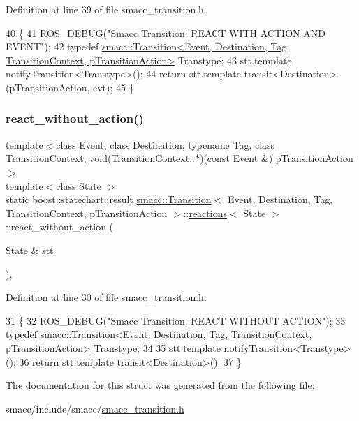 Definition at line 39 of file smacc\+\_\+transition.\+h.


\begin{DoxyCode}
40     \{
41       ROS\_DEBUG(\textcolor{stringliteral}{"Smacc Transition: REACT WITH ACTION AND EVENT"});
42       \textcolor{keyword}{typedef} 
      \hyperlink{classsmacc_1_1Transition}{smacc::Transition<Event, Destination, Tag, TransitionContext, pTransitionAction>}
       Transtype;
43       stt.template notifyTransition<Transtype>();
44       \textcolor{keywordflow}{return} stt.template transit<Destination>(pTransitionAction, evt);
45     \}
\end{DoxyCode}
\mbox{\label{structsmacc_1_1Transition_1_1reactions_a96a69cf5b0cbd1e8fc49ca57efb37581}} 
\subsubsection{\texorpdfstring{react\+\_\+without\+\_\+action()}{react\_without\_action()}}
{\footnotesize\ttfamily template$<$class Event, class Destination, typename Tag, class Transition\+Context, void(\+Transition\+Context\+::$\ast$)(const Event \&) p\+Transition\+Action$>$ \\
template$<$class State $>$ \\
static boost\+::statechart\+::result \hyperlink{classsmacc_1_1Transition}{smacc\+::\+Transition}$<$ Event, Destination, Tag, Transition\+Context, p\+Transition\+Action $>$\+::\hyperlink{structsmacc_1_1Transition_1_1reactions}{reactions}$<$ State $>$\+::react\+\_\+without\+\_\+action (\begin{DoxyParamCaption}\item[{State \&}]{stt }\end{DoxyParamCaption})\hspace{0.3cm}{\ttfamily [inline]}, {\ttfamily [static]}}



Definition at line 30 of file smacc\+\_\+transition.\+h.


\begin{DoxyCode}
31     \{
32       ROS\_DEBUG(\textcolor{stringliteral}{"Smacc Transition: REACT WITHOUT ACTION"});
33       \textcolor{keyword}{typedef} 
      \hyperlink{classsmacc_1_1Transition}{smacc::Transition<Event, Destination, Tag, TransitionContext, pTransitionAction>}
       Transtype;
34 
35       stt.template notifyTransition<Transtype>();
36       \textcolor{keywordflow}{return} stt.template transit<Destination>();
37     \}
\end{DoxyCode}


The documentation for this struct was generated from the following file\+:\begin{DoxyCompactItemize}
\item 
smacc/include/smacc/\hyperlink{smacc__transition_8h}{smacc\+\_\+transition.\+h}\end{DoxyCompactItemize}
